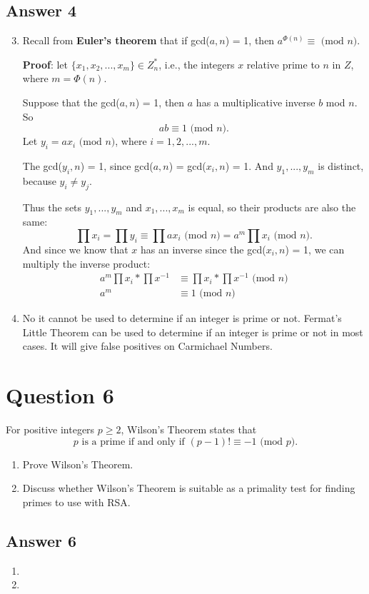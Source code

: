 \documentclass{article}
\begin{document}
	\subsection*{Answer 4}
	\renewcommand{\theenumi}{\alph{enumi}}
	\begin{enumerate}
		\setcounter{enumi}{2}
		\item Recall from \textbf{Euler's theorem} that if gcd($a,n$) = 1, then $a^{\Phi(n)} \equiv \text{ (mod $n$)}$.
		
		\textbf{Proof}: let $\{x_1,x_2,...,x_m\} \in Z_n^*$, i.e., the integers $x$ relative prime to $n$ in $Z$, where $m = \Phi(n)$.
		
		Suppose that the gcd($a,n$) = 1, then $a$ has a multiplicative inverse $b$ mod $n$. So 
		$$
		ab \equiv 1 \text{ (mod $n$)}.
		$$
		Let $y_i = ax_i \text{ (mod $n$)}$, where $i = 1,2,...,m$. 
		
		The gcd($y_i,n$) = 1, since gcd($a,n$) = gcd($x_i,n$) = 1. And $y_1,...,y_m$ is distinct, because $y_i \not= y_j$.
		
		Thus the sets $y_1,...,y_m$ and $x_1,...,x_m$ is equal, so their products are also the same:
		$$
		\prod x_i = \prod y_i \equiv \prod ax_i \text{ (mod $n$)} = a^m \prod x_i \text{ (mod $n$)}.
		$$
		And since we know that $x$ has an inverse since the gcd($x_i,n$) = 1, we can multiply the inverse product:
		\[
		\begin{split}
		a^m \prod x_i * \prod x^{-1} &\equiv \prod x_i * \prod x^{-1} \text{ (mod $n$)}\\		
		a^m &\equiv 1 \text{ (mod $n$)}
		\end{split}
		\]
	
		\item No it cannot be used to determine if an integer is prime or not. Fermat's Little Theorem can be used to determine if an integer is prime or not in most cases. It will give false positives on Carmichael Numbers.
	\end{enumerate}	

	\medspace

	\section*{Question 6}
	For positive integers $p \ge 2$, Wilson’s Theorem states that 
	$$
	p \text{ is a prime if and only if } (p - 1)!  \equiv -1 \text{ (mod $p$).}
	$$
	\renewcommand{\theenumi}{\alph{enumi}}
	\begin{enumerate}
		\item Prove Wilson’s Theorem.
		
		\item Discuss whether Wilson’s Theorem is suitable as a primality test for finding	primes to use with RSA.
	\end{enumerate}	

	\subsection*{Answer 6}
	\renewcommand{\theenumi}{\alph{enumi}}
	\begin{enumerate}
		\item 
		
		\item 
	\end{enumerate}	
\end{document}
